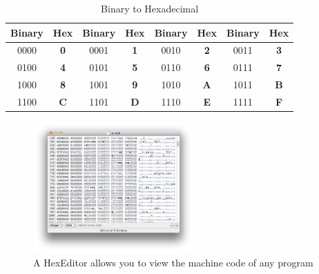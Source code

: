 \begin{table}[h]
  \ttfamily
  \centering
\begin{tabular}{|c|c||c|c||c|c||c|c|}
  \hline
  Binary & Hex & Binary & Hex & Binary & Hex & Binary & Hex  \\
  \hline
  0000 & \textbf{0} & 0001  & \textbf{1}  & 0010  &  \textbf{2} & 0011 & \textbf{3} \\
  0100 & \textbf{4} & 0101 & \textbf{5} & 0110 & \textbf{6} & 0111 & \textbf{7} \\
  1000 & \textbf{8} & 1001 & \textbf{9} & 1010 & \textbf{A} & 1011 & \textbf{B} \\
  1100 & \textbf{C} & 1101 & \textbf{D} & 1110 & \textbf{E} & 1111 & \textbf{F} \\
  \hline
\end{tabular}
  \caption{Binary to Hexadecimal}
\end{table}

\begin{figure}[h]
   \centering
   \includegraphics[width=0.55\textwidth]{./topics/programs-and-compilers/images/HexEditor} 
   \caption{A HexEditor allows you to view the machine code of any program}
   \label{fig:hex-editor}
\end{figure}



